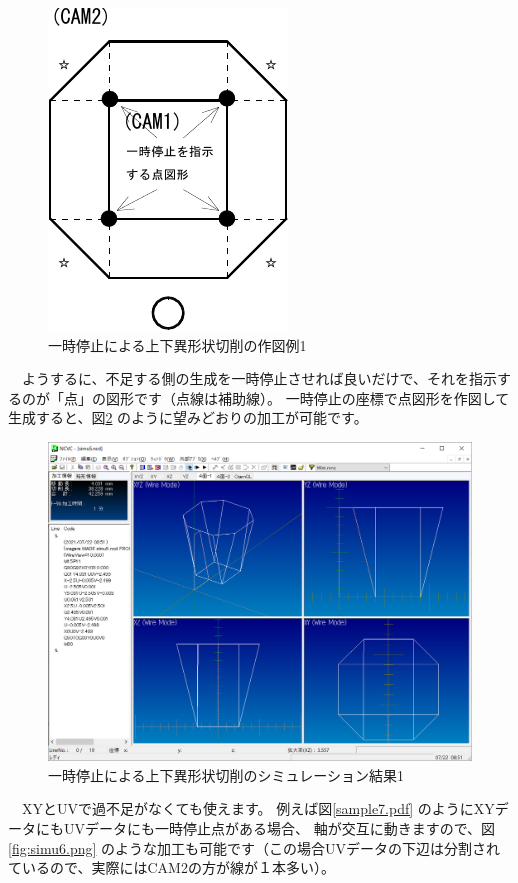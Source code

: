 \begin{figure}[H]
\centering
\includegraphics{No2/fig/sample6-crop.pdf}
\caption{一時停止による上下異形状切削の作図例1}
\label{fig:sample6.pdf}
\end{figure}

　ようするに、不足する側の生成を一時停止させれば良いだけで、それを指示するのが「点」の図形です（点線は補助線）。
一時停止の座標で点図形を作図して生成すると、図\ref{fig:simu5.png} のように望みどおりの加工が可能です。

\begin{figure}[H]
\centering
\includegraphics[scale=0.5]{No2/fig/simu5.png}
\caption{一時停止による上下異形状切削のシミュレーション結果1}
\label{fig:simu5.png}
\end{figure}

　XYとUVで過不足がなくても使えます。
例えば図\ref{sample7.pdf} のようにXYデータにもUVデータにも一時停止点がある場合、
軸が交互に動きますので、図\ref{fig:simu6.png} のような加工も可能です（この場合UVデータの下辺は分割されているので、実際にはCAM2の方が線が１本多い）。


